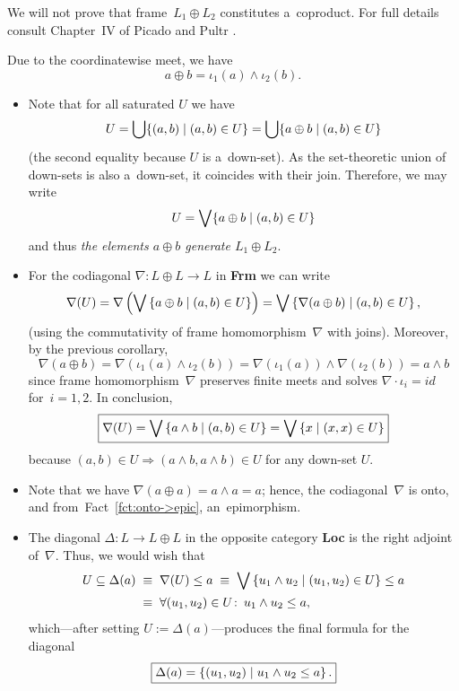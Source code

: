 We will not prove that frame~$L_1 \oplus L_2$ constitutes a~coproduct.
For full details consult Chapter~IV of Picado and Pultr
\cite{picado-pultr12}.

\begin{cor}
 \label{oplus-iota}
Due to the coordinatewise meet, we have
\[
  a \oplus b = \iota_1(a) \wedge \iota_2(b).
\]
\end{cor}

\begin{itemize}
\item
Note that for all saturated $U$ we have
\[
  U
  = \bigcup \{ (a, b) \mid (a, b)\in U \} = \bigcup \{ a \oplus b \mid (a, b)\in
  U \}
\]
(the second equality because $U$ is a~down-set).
As the set-theoretic union of down-sets is also a~down-set, it coincides with
their join.
Therefore, we may write
\[
  U
  = \bigvee \{ a \oplus b \mid (a, b)\in U \}
\]
and thus
 \label{a+b-gen}
\emph{the elements $a \oplus b$ generate $L_1 \oplus L_2$\/}.
\end{itemize}

\begin{itemize}
\item
{}
\label{codiag-in-Frm}
For the codiagonal $\nabla\colon L \oplus L \to L$ in {\bf Frm} we can write
\[
  \nabla(U)
  = \nabla \left( \bigvee \left\{ a \oplus b \mid (a, b)\in U \right\} \right)
  = \bigvee \left\{ \nabla(a \oplus b) \mid (a, b)\in U \right\},
\]
(using the commutativity of frame homomorphism~$\nabla$ with joins).
Moreover, by the previous corollary,
\[
  \nabla(a \oplus b)
  = \nabla( \iota_1(a) \wedge \iota_2(b) )
  = \nabla(\iota_1(a)) \wedge \nabla(\iota_2(b))
  = a \wedge b
\]
since frame homomorphism~$\nabla$ preserves finite meets and solves
$\nabla\cdot \iota_i = id$ for~$i = 1, 2$.
In conclusion,
\[
  \boxed{
    \nabla(U)
    = \bigvee \left\{ a \wedge b \mid (a, b)\in U \right\}
    = \bigvee \left\{ x \mid (x, x)\in U \right\}
  }
\]
because $(a, b)\in U \Rightarrow (a \wedge b, a \wedge b)\in U$ for any
down-set $U$.

\item Note that we have $\nabla(a \oplus a) = a \wedge a = a$; hence, the
codiagonal~$\nabla$ is onto, and from~Fact~\ref{fct:onto->epic}\thinspace,
an~epimorphism.

\item The diagonal $\Delta\colon L \to L \oplus L$ in the opposite category
{\bf Loc} is the right adjoint of~$\nabla$.
Thus, we would wish that
\begin{align*}
  U\subseteq \Delta(a)
  \; &\equiv \; \nabla(U) \le a
  \; \equiv \; \bigvee \left\{ u_1 \wedge u_2 \mid (u_1, u_2)\in U \right\} \le
  a \\
  \; &\equiv \; \forall (u_1, u_2)\in U\colon \, u_1 \wedge u_2 \le a,
\end{align*}
which---after setting $U := \Delta(a)$---produces the final formula for the
diagonal
\[
  \boxed{
    \Delta(a) = \left\{ (u_1, u_2) \mid u_1 \wedge u_2 \le a \right\}.
  }
\]
\end{itemize}

